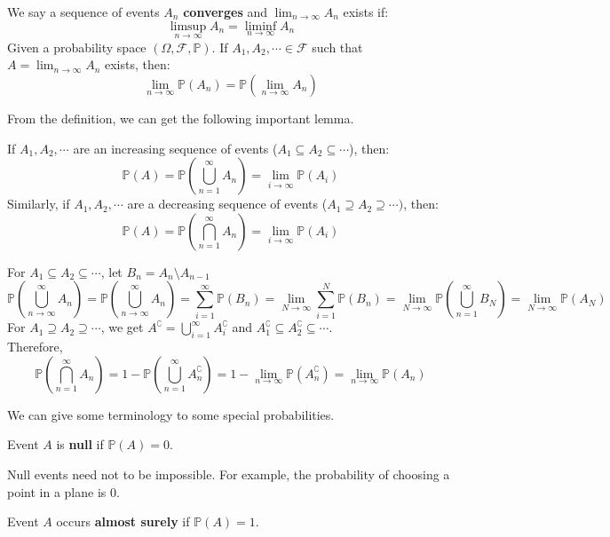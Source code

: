 \documentclass{huhtakm-template-book}
\newcommand{\prob}{\mathbb{P}}
\begin{document}
\begin{defn}
	We say a sequence of events $A_{n}$ \textbf{converges} and $\lim_{n\to\infty}A_{n}$ exists if:
	\begin{equation*}
		\limsup_{n\to\infty}A_{n}=\liminf_{n\to\infty}A_{n}
	\end{equation*}
	Given a probability space $(\Omega,\mathcal{F},\prob)$. If $A_{1},A_{2},\cdots\in\mathcal{F}$ such that $A=\lim_{n\to\infty}A_{n}$ exists, then:
	\begin{equation*}
		\lim_{n\to\infty}\prob(A_{n})=\prob\left(\lim_{n\to\infty}A_{n}\right)
	\end{equation*}
\end{defn}
From the definition, we can get the following important lemma.
\begin{lem}
	\label{Continuous probability}
	If $A_{1},A_{2},\cdots$ are an increasing sequence of events ($A_{1}\subseteq A_{2}\subseteq\cdots$), then:
	\begin{equation*}
		\prob(A)=\prob\left(\bigcup_{n=1}^{\infty}A_{n}\right)=\lim_{i\to\infty}\prob(A_{i})
	\end{equation*}
	Similarly, if $A_{1},A_{2},\cdots$ are a decreasing sequence of events ($A_{1}\supseteq A_{2}\supseteq\cdots)$, then:
	\begin{equation*}
		\prob(A)=\prob\left(\bigcap_{n=1}^{\infty}A_{n}\right)=\lim_{i\to\infty}\prob(A_{i})
	\end{equation*}
\end{lem}
\begin{proofing}
	For $A_{1}\subseteq A_{2}\subseteq\cdots$, let $B_{n}=A_{n}\setminus A_{n-1}$
	\begin{equation*}
		\prob\left(\bigcup_{n\to\infty}^{\infty}A_{n}\right)=\prob\left(\bigcup_{n\to\infty}^{\infty}A_{n}\right)=\sum_{i=1}^{\infty}\prob(B_{n})=\lim_{N\to\infty}\sum_{i=1}^{N}\prob(B_{n})=\lim_{N\to\infty}\prob\left(\bigcup_{n=1}^{\infty}B_{N}\right)=\lim_{N\to\infty}\prob(A_{N})
	\end{equation*}
	For $A_{1}\supseteq A_{2}\supseteq\cdots$, we get $A^{\complement}=\bigcup_{i=1}^{\infty}A_{i}^{\complement}$ and $A_{1}^{\complement}\subseteq A_{2}^{\complement}\subseteq\cdots$.\\
	Therefore,
	\begin{equation*}
		\prob\left(\bigcap_{n=1}^{\infty}A_{n}\right)=1-\prob\left(\bigcup_{n=1}^{\infty}A_{n}^{\complement}\right)=1-\lim_{n\to\infty}\prob(A_{n}^{\complement})=\lim_{n\to\infty}\prob(A_{n})
	\end{equation*}
\end{proofing}
We can give some terminology to some special probabilities.
\begin{defn}
	Event $A$ is \textbf{null} if $\prob(A)=0$.
\end{defn}
\begin{rem}
	Null events need not to be impossible. For example, the probability of choosing a point in a plane is $0$.
\end{rem}
\begin{defn}
	Event $A$ occurs \textbf{almost surely} if $\prob(A)=1$.
\end{defn}
\end{document}
